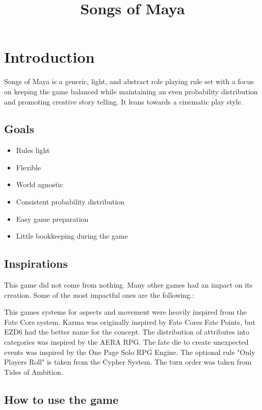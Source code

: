 \documentclass[11pt]{article}
\date{}
\title{Songs of Maya}
\begin{document}
\maketitle
\tableofcontents

{

\newpage
\section{Introduction}
\label{sec:org523eeb0}

Songs of Maya is a generic, light, and abstract role playing rule set with a focus on keeping the game balanced while maintaining an even probability distribution and promoting creative story telling. It leans towards a cinematic play style.
\subsection{Goals}
\label{sec:orgafaa650}

\begin{itemize}
\item Rules light
\item Flexible
\item World agnostic
\item Consistent probability distribution
\item Easy game preparation
\item Little bookkeeping during the game
\end{itemize}
\subsection{Inspirations}
\label{sec:orgc39c834}

This game did not come from nothing. Many other games had an impact on its creation. Some of the most impactful ones are the following.:

This games systems for aspects and movement were heavily inspired from the Fate Core system.
Karma was originally inspired by Fate Cores Fate Points, but EZD6 had the better name for the concept.
The distribution of attributes into categories was inspired by the AERA RPG.
The fate die to create unexpected events was inspired by the One Page Solo RPG Engine.
The optional rule "Only Players Roll" is taken from the Cypher System.
The turn order was taken from Tides of Ambition.
\subsection{How to use the game}
\label{sec:orgbcd2c5a}

}
\end{document}
